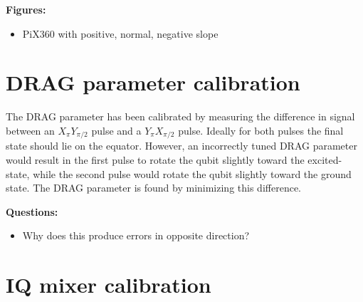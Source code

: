       \textbf{Figures:}
      \begin{itemize}
        \item PiX360 with positive, normal, negative slope
      \end{itemize}

    \section{DRAG parameter calibration}
      The DRAG parameter has been calibrated by measuring the difference in signal between an $X_{\pi} Y_{\pi/2}$ pulse and a $Y_{\pi} X_{\pi/2}$ pulse. Ideally for both pulses the final state should lie on the equator. However, an incorrectly tuned DRAG parameter would result in the first pulse to rotate the qubit slightly toward the excited-state, while the second pulse would rotate the qubit slightly toward the ground state. The DRAG parameter is found by minimizing this difference.

      \textbf{Questions:}
      \begin{itemize}
        \item Why does this produce errors in opposite direction?
      \end{itemize}

    \section{IQ mixer calibration}
      \label{sec:Mixer calibration}

